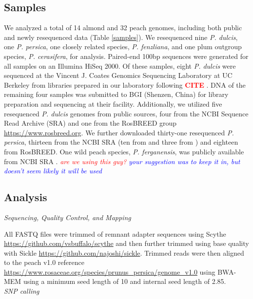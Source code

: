 \documentclass[12pt]{article}
\newcommand{\citex}{\textcolor{red}{\bf CITE }}
\newcommand{\jri}[1]{\textcolor{red}{\emph{#1}}}
\newcommand{\dv}[1]{\textcolor{blue}{\emph{#1}}}
\begin{document}
\subsection*{Samples}
We analyzed a total of 14 almond and 32 peach genomes, including both public and newly resequenced data (Table \ref{samples}). We resequenced nine \emph{P. dulcis}, one \emph{P. persica}, one closely related species, \emph{P. fenzliana}, and one plum outgroup species, \emph{P. cerasifera}, for analysis.
%
Paired-end 100bp sequences were generated for all samples on an Illumina HiSeq 2000. 
%
Of these samples, eight \emph{P. dulcis} were sequenced at the Vincent J. Coates Genomics Sequencing Laboratory at UC Berkeley from libraries prepared in our laboratory following \citex. 
DNA of the remaining four samples was submitted to BGI (Shenzen, China) for library preparation and sequencing at their facility.
%
%
Additionally, we utilized five resequenced \emph{P. dulcis} genomes from public sources, four from \citealt{koepke2013comparative} 
the NCBI Sequence Read Archive (SRA) and one from the RosBREED group \url{https://www.rosbreed.org}.
%
We further downloaded thirty-one resequenced \emph{P. persica}, thirteen from the NCBI SRA (ten from \citealt{verde2013high} and three from \citealt{ahmad2011whole}) and eighteen from RosBREED.
%
One wild peach species, \emph{P. ferganensis}, was publicly available from NCBI SRA \citep{verde2013high}. \jri{are we using this guy?} \dv{your suggestion was to keep it in, but doesn't seem likely it will be used}
%
\subsection*{Analysis}
\emph{Sequencing, Quality Control, and Mapping}

%
All FASTQ files were trimmed of remnant adapter sequences using Scythe \url{https://github.com/vsbuffalo/scythe} and then further trimmed using base quality with Sickle \url{https://github.com/najoshi/sickle}. 
%
Trimmed reads were then aligned to the peach v1.0 reference \url{https://www.rosaceae.org/species/prunus_persica/genome_v1.0} using BWA-MEM  \citep{li2013aligning} using a minimum seed length of 10 and internal seed length of 2.85.
%
\\
\emph{SNP calling}
\end{document}
